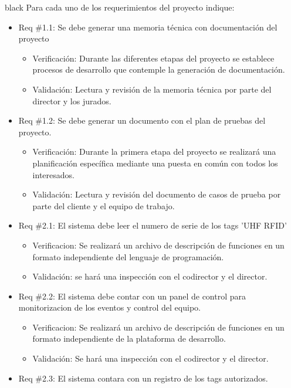 \documentclass[
11pt, %
codirector, %
]{charter}
\begin{document}
\begin{consigna}{black}
Para cada uno de los requerimientos del proyecto indique:
\begin{itemize} 
\item Req \#1.1: Se debe generar una memoria técnica con documentación del proyecto
\begin{itemize}
	\item Verificación: Durante las diferentes etapas del proyecto se establece procesos de desarrollo que contemple la generación de documentación.

	\item Validación: Lectura y revisión de la  memoria técnica por parte del director y los jurados.
\end{itemize}
\item Req \#1.2: Se debe generar un documento con el plan de pruebas del proyecto. 
\begin{itemize}
	\item Verificación: Durante la primera etapa del proyecto se realizará una planificación específica mediante una puesta en común con todos los interesados.
	\item Validación: Lectura y revisión del documento de casos de prueba por parte del cliente y el equipo de trabajo.
\end{itemize}
\item Req \#2.1: El sistema debe leer el numero de serie de los tags ’UHF RFID’
\begin{itemize}
	\item Verificacion: Se realizará un archivo de descripción de funciones en un formato independiente del lenguaje de programación.
	\item Validación: se hará una inspección con el codirector y el director.
\end{itemize}
\item Req \#2.2: El sistema debe contar con un panel de control para monitorizacion de los eventos y control del equipo.
\begin{itemize}
	\item Verificacion: Se realizará un archivo de descripción de funciones en un formato independiente de la plataforma de desarrollo.
	\item Validación: Se hará una inspección con el codirector y el director.
\end{itemize}
\item Req \#2.3: El sistema contara con un registro de los tags autorizados.
\begin{itemize}

\end{itemize}
\end{itemize}
\end{consigna}
\end{document}
